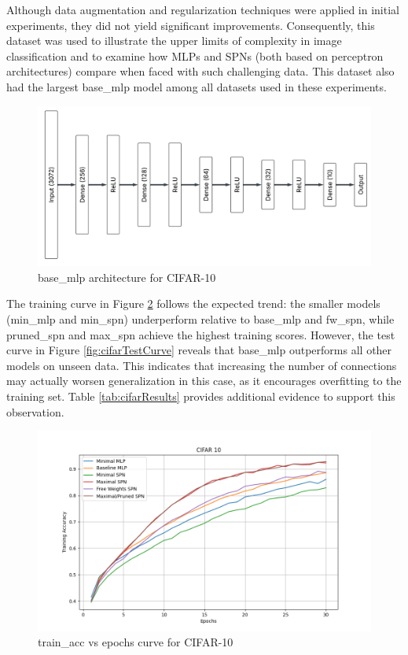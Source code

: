 Although data augmentation and regularization techniques were applied in initial experiments, they did not yield significant improvements. Consequently, this dataset was used to illustrate the upper limits of complexity in image classification and to examine how MLPs and SPNs (both based on perceptron architectures) compare when faced with such challenging data. This dataset also had the largest base\_mlp model among all datasets used in these experiments.

\begin{figure}[H]
    \centering
    \includegraphics[width=1.0\textwidth]{Figures/Results/CIFAR_10/CIFAR_base_mlp_architecture.png} 
    \captionsetup{justification=centering}  %
    \caption{base\_mlp architecture for CIFAR-10}
    \label{fig:cifarMlpBaseArch}
\end{figure}

The training curve in Figure \ref{fig:cifarTrainCurve} follows the expected trend: the smaller models (min\_mlp and min\_spn) underperform relative to base\_mlp and fw\_spn, while pruned\_spn and max\_spn achieve the highest training scores. However, the test curve in Figure \ref{fig:cifarTestCurve} reveals that base\_mlp outperforms all other models on unseen data. This indicates that increasing the number of connections may actually worsen generalization in this case, as it encourages overfitting to the training set. Table \ref{tab:cifarResults} provides additional evidence to support this observation.

\begin{figure}[H]
    \centering
    \includegraphics[width=\linewidth]{Figures/Results/CIFAR_10/training_accuracy_plot.png} %
    \captionsetup{width=\linewidth}
    \caption{train\_acc vs epochs curve for CIFAR-10}
    \label{fig:cifarTrainCurve}
\end{figure}

